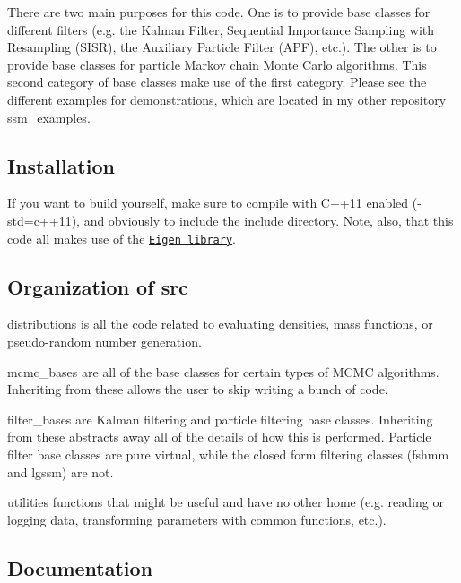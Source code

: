 There are two main purposes for this code. One is to provide base classes for different filters (e.\+g. the Kalman Filter, Sequential Importance Sampling with Resampling (S\+I\+SR), the Auxiliary Particle Filter (A\+PF), etc.). The other is to provide base classes for particle Markov chain Monte Carlo algorithms. This second category of base classes make use of the first category. Please see the different examples for demonstrations, which are located in my other repository {\ttfamily ssm\+\_\+examples}.

\subsection*{Installation}

If you want to build yourself, make sure to compile with C++11 enabled ({\ttfamily -\/std=c++11}), and obviously to include the {\ttfamily include} directory. Note, also, that this code all makes use of the \href{http://eigen.tuxfamily.org/}{\tt Eigen library}.

\subsection*{Organization of {\ttfamily src}}


\begin{DoxyEnumerate}
\item {\ttfamily distributions} is all the code related to evaluating densities, mass functions, or pseudo-\/random number generation.
\item {\ttfamily mcmc\+\_\+bases} are all of the base classes for certain types of M\+C\+MC algorithms. Inheriting from these allows the user to skip writing a bunch of code.
\item {\ttfamily filter\+\_\+bases} are Kalman filtering and particle filtering base classes. Inheriting from these abstracts away all of the details of how this is performed. Particle filter base classes are pure virtual, while the closed form filtering classes (fshmm and lgssm) are not.
\item {\ttfamily utilities} functions that might be useful and have no other home (e.\+g. reading or logging data, transforming parameters with common functions, etc.).
\end{DoxyEnumerate}

\subsection*{Documentation}

